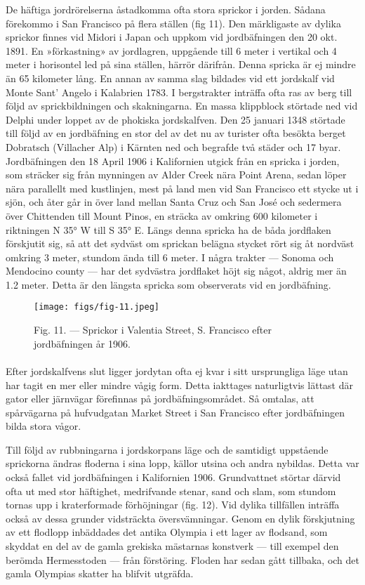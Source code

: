\documentclass[a4paper, 12pt, oneside, swedish]{article}
\begin{document}
De häftiga jordrörelserna åstadkomma ofta stora sprickor i jorden. Sådana förekommo i San Francisco på flera ställen (fig 11). Den märkligaste av dylika sprickor finnes vid Midori i Japan och uppkom vid jordbäfningen den 20 okt. 1891. En »förkastning» av jordlagren, uppgående till 6 meter i vertikal och 4 meter i horisontel led på sina ställen, härrör därifrån. Denna spricka är ej mindre än 65 kilometer lång. En annan av samma slag bildades vid ett jordskalf vid Monte Sant' Angelo i Kalabrien 1783. I bergstrakter inträffa ofta ras av berg till följd av sprickbildningen och skakningarna. En massa klippblock störtade ned vid Delphi under loppet av de phokiska jordskalfven. Den 25 januari 1348 störtade till följd av en jordbäfning en stor del av det nu av turister ofta besökta berget Dobratsch (Villacher Alp) i Kärnten ned och begrafde två städer och 17 byar. Jordbäfningen den 18 April 1906 i Kalifornien utgick från en spricka i jorden, som sträcker sig från mynningen av Alder Creek nära Point Arena, sedan löper nära parallellt med kustlinjen, mest på land men vid San Francisco ett stycke ut i sjön, och åter går in över land mellan Santa Cruz och San José och sedermera över Chittenden till Mount Pinos, en sträcka av omkring 600 kilometer i riktningen N 35° W till S 35° E. Längs denna spricka ha de båda jordflaken förskjutit sig, så att det sydväst om sprickan belägna stycket rört sig åt nordväst omkring 3 meter, stundom ända till 6 meter. I några trakter --- Sonoma och Mendocino county --- har det sydvästra jordflaket höjt sig något, aldrig mer än 1.2 meter. Detta är den längsta spricka som observerats vid en jordbäfning.

\begin{figure}[H]
\centering
\texttt{[image: figs/fig-11.jpeg]}
\caption{Fig. 11. --- Sprickor i Valentia Street, S. Francisco efter jordbäfningen år 1906.}
\end{figure}
\paragraph{}
Efter jordskalfvens slut ligger jordytan ofta ej kvar i sitt ursprungliga läge utan har tagit en mer eller mindre vågig form. Detta iakttages naturligtvis lättast där gator eller järnvägar förefinnas på jordbäfningsområdet. Så omtalas, att spårvägarna på hufvudgatan Market Street i San Francisco efter jordbäfningen bilda stora vågor.

Till följd av rubbningarna i jordskorpans läge och de samtidigt uppstående sprickorna ändras floderna i sina lopp, källor utsina och andra nybildas. Detta var också fallet vid jordbäfningen i Kalifornien 1906. Grundvattnet störtar därvid ofta ut med stor häftighet, medrifvande stenar, sand och slam, som stundom tornas upp i kraterformade förhöjningar (fig. 12). Vid dylika tillfällen inträffa också av dessa grunder vidsträckta översvämningar. Genom en dylik förskjutning av ett flodlopp inbäddades det antika Olympia i ett lager av flodsand, som skyddat en del av de gamla grekiska mästarnas konstverk --- till exempel den berömda Hermesstoden --- från förstöring. Floden har sedan gått tillbaka, och det gamla Olympias skatter ha blifvit utgräfda.
\end{document}

